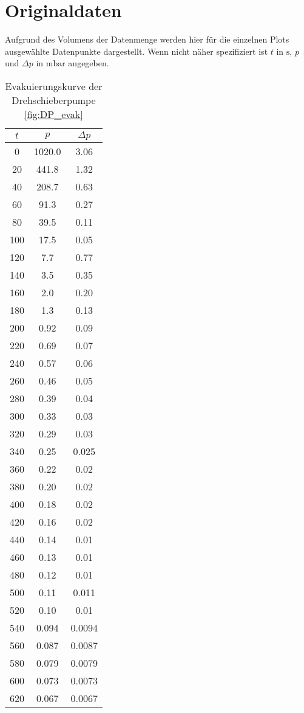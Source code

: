 \section{Originaldaten}
\label{sec:Originaldaten}

Aufgrund des Volumens der Datenmenge werden hier für die einzelnen Plots ausgewählte Datenpunkte dargestellt.
Wenn nicht näher spezifiziert ist $t$ in $\si{\second}$, $p$ und $\Delta p$ in $\si{\milli\bar}$ angegeben. 

\begin{table}[H]
    \centering
    \caption{Evakuierungskurve der Drehschieberpumpe \ref{fig:DP_evak}}
    \label{tab:DP_Evak}
    \begin{tabular}{c c c}
        \toprule
        {$t$} & {$p$} & {$\Delta p$} \\
        \midrule
        0 & 1020.0 & 3.06\\
        20 & 441.8 & 1.32\\
        40 & 208.7 & 0.63\\
        60 & 91.3 & 0.27\\
        80 & 39.5 & 0.11\\
        100 & 17.5 & 0.05\\
        120 & 7.7 & 0.77\\
        140 & 3.5 & 0.35\\
        160 & 2.0 & 0.20\\
        180 & 1.3 & 0.13\\
        200 & 0.92 & 0.09\\
        220 & 0.69 & 0.07\\
        240 & 0.57 & 0.06\\
        260 & 0.46 & 0.05\\
        280 & 0.39 & 0.04\\
        300 & 0.33 & 0.03\\
        320 & 0.29 & 0.03\\
        340 & 0.25 & 0.025\\
        360 & 0.22 & 0.02\\
        380 & 0.20 & 0.02\\
        400 & 0.18 & 0.02\\
        420 & 0.16 & 0.02\\
        440 & 0.14 & 0.01\\
        460 & 0.13 & 0.01\\
        480 & 0.12 & 0.01\\
        500 & 0.11 & 0.011\\
        520 & 0.10 & 0.01\\
        540 & 0.094 & 0.0094\\
        560 & 0.087 & 0.0087\\
        580 & 0.079 & 0.0079\\
        600 & 0.073 & 0.0073\\
        620 & 0.067 & 0.0067 \\
        \bottomrule
    \end{tabular}
\end{table}

